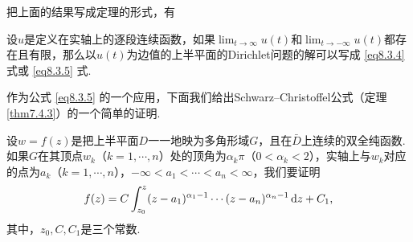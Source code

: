 把上面的结果写成定理的形式，有
\begin{theorem}\label{thm8.3.1}
  设$u$是定义在实轴上的逐段连续函数，如果$\lim_{t\to\infty}u(t)$和$\lim_{t\to-\infty}u(t)$都存在且有限，那么以$u(t)$为边值的上半平面的Dirichlet问题的解可以写成 \eqref{eq8.3.4} 式或 \eqref{eq8.3.5} 式.
\end{theorem}

作为公式 \eqref{eq8.3.5} 的一个应用，下面我们给出Schwarz--Christoffel公式（定理 \ref{thm7.4.3}）的一个简单的证明.

设$w=f(z)$是把上半平面$D$一一地映为多角形域$G$，且在$\bar D$上连续的双全纯函数.如果$G$在其顶点$w_k$（$k=1,\cdots,n$）处的顶角为$\alpha_k\pi$（$0<\alpha_k<2$），实轴上与$w_k$对应的点为$a_k$（$k=1,\cdots,n$），$-\infty<a_1<\cdots<a_n<\infty$，我们要证明
\begin{equation}\label{eq8.3.6}
  f(z) = C\int_{z_0}^z(z-a_1)^{\alpha_1-1}\cdots(z-a_n)^{\alpha_n-1}\mathop{}\!\mathrm dz+C_1,
\end{equation}
其中，$z_0,C,C_1$是三个常数.

